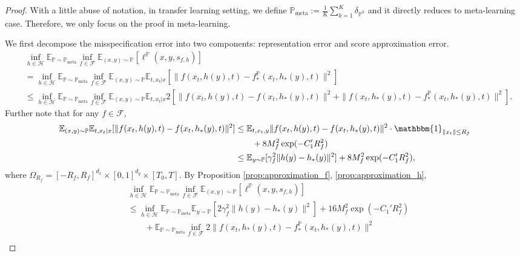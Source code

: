 \documentclass{article}
\numberwithin{equation}{section}
\newcommand{\E}{\mathbb{E}}
\theoremstyle{definition}
\newcommand{\Pmeta}{\mathbb{P}_{\text{meta}}}
\renewcommand{\P}{\mathbb{P}}
\begin{document}
\begin{proof}
    With a little abuse of notation, in transfer learning setting, we define $\Pmeta:=\frac{1}{K}\sum_{k=1}^K\delta_{\P^k}$ and it directly reduces to meta-learning case.
    Therefore, we only focus on the proof in meta-learning.
    
    We first decompose the misspecification error into two components: representation error and score approximation error.
    \begin{equation}
        \begin{aligned}
            &\inf_{h\in\mathcal{H}}\E_{\P\sim\Pmeta}\inf_{f\in\mathcal{F}}\E_{(x,y)\sim\P} [\ell^\P(x,y,s_{f,h})] \\
            &= \inf_{h\in\mathcal{H}}\E_{\P\sim\Pmeta}\inf_{f\in\mathcal{F}}\E_{(x,y)\sim\P}\E_{t,x_t|x} [\|f(x_t,h(y),t)-f_*^\P(x_t,h_*(y),t)\|^2] \\
            &\leq \inf_{h\in\mathcal{H}}\E_{\P\sim\Pmeta}\inf_{f\in\mathcal{F}}\E_{(x,y)\sim\P}\E_{t,x_t|x} 2\left[\|f(x_t,h(y),t)-f(x_t,h_*(y),t)\|^2+\|f(x_t,h_*(y),t)-f_*^\P(x_t,h_*(y),t)\|^2\right].
        \end{aligned}
    \end{equation}
    Further note that for any $f\in\mathcal{F}$, 
    \begin{equation}
        \begin{aligned}
            \E_{(x,y)\sim\P}\E_{t,x_t|x} [\|f(x_t,h(y),t)-f(x_t,h_*(y),t)\|^2]
            &\leq \E_{t,x_t,y} \|f(x_t,h(y),t)-f(x_t,h_*(y),t)\|^2\cdot \mathbbm{1}_{\|x_t\|\leq R_f} \\
            &\qquad + 8M_f^2\exp(-C_1'R_f^2) \\
            &\leq \E_{y\sim\P}[\gamma_f^2\|h(y)-h_*(y)\|^2] + 8M_f^2\exp(-C_1'R_f^2),
        \end{aligned}
    \end{equation}
    where $\Omega_{R_f}=[-R_f,R_f]^{d_x}\times[0,1]^{d_y}\times[T_0,T]$.
    By Proposition \ref{prop:approximation_f}, \ref{prop:approximation_h},
    \begin{equation}
        \begin{aligned}
            &\inf_{h\in\mathcal{H}}\E_{\P\sim\Pmeta}\inf_{f\in\mathcal{F}}\E_{(x,y)\sim\P} [\ell^\P(x,y,s_{f,h})] \\
            &\leq 
            \inf_{h\in\mathcal{H}}\E_{\P\sim\Pmeta}\E_{y\sim\P}[2\gamma_f^2\|h(y)-h_*(y)\|^2] + 16M_f^2\exp(-C_1'R_f^2) \\
            &\qquad +\E_{\P\sim\Pmeta}\inf_{f\in\mathcal{F}}2\|f(x_t,h_*(y),t)-f_*^\P(x_t,h_*(y),t)\|^2 \\

\end{aligned}
\end{equation}
\end{proof}
\end{document}
